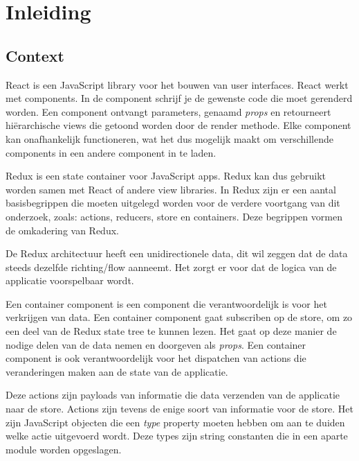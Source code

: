 
\chapter*{Inleiding}
\label{ch:inleiding}

\section{Context}
\label{sec:context}

React is een JavaScript library voor het bouwen van user interfaces. React werkt met components. In de component schrijf je de gewenste code die moet gerenderd worden. Een component ontvangt parameters, genaamd \textit{props} en retourneert hiërarchische views die getoond worden door de render methode. Elke component kan onafhankelijk functioneren, wat het dus mogelijk maakt om verschillende components in een andere component in te laden. \autocite{React01} 

Redux is een state container voor JavaScript apps. Redux kan dus gebruikt worden samen met React of andere view libraries. 
In Redux zijn er een aantal basisbegrippen die moeten uitgelegd worden voor de verdere voortgang van dit onderzoek, zoals: actions, reducers, store en containers. Deze begrippen vormen de omkadering van Redux. \autocite{Redux02}

De Redux architectuur heeft een unidirectionele data, dit wil zeggen dat de data steeds dezelfde richting/flow aanneemt. Het zorgt er voor dat de logica van de applicatie voorspelbaar wordt.  

Een container component is een component die verantwoordelijk is voor het verkrijgen van data. Een container component gaat subscriben op de store, om zo een deel van de Redux state tree te kunnen lezen. Het gaat op deze manier de nodige delen van de data nemen en doorgeven als \textit{props}. Een container component is ook verantwoordelijk voor het dispatchen van actions die veranderingen maken aan de state van de applicatie. 

Deze actions zijn payloads van informatie die data verzenden van de applicatie naar de store. Actions zijn tevens de enige soort van informatie voor de store. Het zijn JavaScript objecten die een \textit{type} property moeten hebben om aan te duiden welke actie uitgevoerd wordt. Deze types zijn string constanten die in een aparte module worden opgeslagen. 

